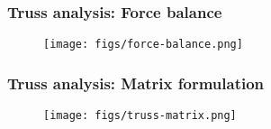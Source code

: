 \documentclass[notes]{beamer}
\begin{document}
\begin{frame}
	\frametitle{Truss analysis: Force balance}
	\begin{figure}[ht]
		\centering
		\texttt{[image: figs/force-balance.png]}
	\end{figure}
\end{frame}

\begin{frame}
	\frametitle{Truss analysis: Matrix formulation}
	\begin{figure}[ht]
		\centering
		\texttt{[image: figs/truss-matrix.png]}
	\end{figure}
\end{frame}
\end{document}
